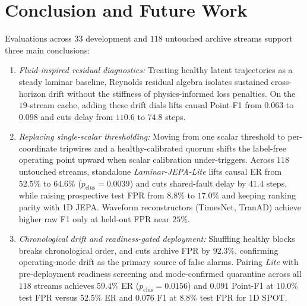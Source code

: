 \documentclass[journal]{IEEEtran}
\begin{document}
\section{Conclusion and Future Work}
\label{sec:conclusion}
Evaluations across $33$ development and $118$ untouched archive streams support three main conclusions:
\begin{enumerate}[leftmargin=*, nosep, itemsep=1pt]
    \item \emph{Fluid-inspired residual diagnostics:} Treating healthy latent trajectories as a steady laminar baseline, Reynolds residual algebra isolates sustained cross-horizon drift without the stiffness of physics-informed loss penalties. On the $19$-stream cache, adding these drift dials lifts causal Point-F1 from $0.063$ to $0.098$ and cuts delay from $110.6$ to $74.8$ steps.
    \item \emph{Replacing single-scalar thresholding:} Moving from one scalar threshold to per-coordinate tripwires and a healthy-calibrated quorum shifts the label-free operating point upward when scalar calibration under-triggers. Across $118$ untouched streams, standalone \emph{Laminar-JEPA-Lite} lifts causal ER from $52.5\%$ to $64.6\%$ ($p_{\text{clus}}=0.0039$) and cuts shared-fault delay by $41.4$ steps, while raising prospective test FPR from $8.8\%$ to $17.0\%$ and keeping ranking parity with 1D JEPA. Waveform reconstructors (TimesNet, TranAD) achieve higher raw F1 only at held-out FPR near $25\%$.
    \item \emph{Chronological drift and readiness-gated deployment:} Shuffling healthy blocks breaks chronological order, and cuts archive FPR by $92.3\%$, confirming operating-mode drift as the primary source of false alarms. Pairing \emph{Lite} with pre-deployment readiness screening and mode-confirmed quarantine across all $118$ streams achieves $59.4\%$ ER ($p_{\text{clus}}=0.0156$) and $0.091$ Point-F1 at $10.0\%$ test FPR versus $52.5\%$ ER and $0.076$ F1 at $8.8\%$ test FPR for 1D SPOT.
\end{enumerate}
\end{document}
